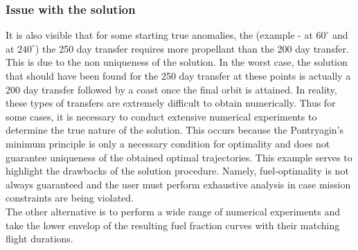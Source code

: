 \subsubsection{Issue with the solution}
It is also visible that for some starting true anomalies, the (example - at $60^\circ$ and at $240^\circ$) the 250 day transfer requires more propellant than the 200 day transfer. This is due to the non uniqueness of the solution. In the worst case, the solution that should have been found for the 250 day transfer at these points is actually a 200 day transfer followed by a coast once the final orbit is attained. In reality, these types of transfers are extremely difficult to obtain numerically. Thus for some cases, it is necessary to conduct extensive numerical experiments to determine the true nature of the solution. This occurs because the Pontryagin's minimum principle is only a necessary condition for optimality and does not guarantee uniqueness of the obtained optimal trajectories. This example serves to highlight the drawbacks of the solution procedure. Namely, fuel-optimality is not always guaranteed and the user must perform exhaustive analysis in case mission constraints are being violated.\\
The other alternative is to perform a wide range of numerical experiments and take the lower envelop of the resulting fuel fraction curves with their matching flight durations.
